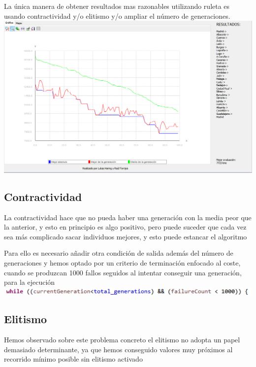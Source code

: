 \documentclass{article}
\begin{document}
\newpage

La única manera de obtener resultados mas razonables utilizando ruleta es usando contractividad y/o elitismo y/o ampliar el número de generaciones.
\\

\includegraphics[scale=0.4]{./images/rule2.png}

\subsection{Contractividad}
La contractividad hace que no pueda haber una generación con la media peor que la anterior, y esto en principio es algo positivo, pero puede suceder que cada vez sea más complicado sacar individuos mejores, y esto puede estancar el algoritmo\par Para ello es necesario añadir otra condición de salida además del número de generaciones y hemos optado por un criterio de terminación enfocado al coste, cuando se produzcan 1000 fallos seguidos al intentar conseguir una generación, para la ejecución
\\

\includegraphics[scale=0.83]{./images/cont.png}

\subsection{Elitismo}
Hemos observado sobre este problema concreto el elitismo no adopta un papel demasiado determinante, ya que hemos conseguido valores muy próximos al recorrido mínimo posible sin elitismo activado
\end{document}
